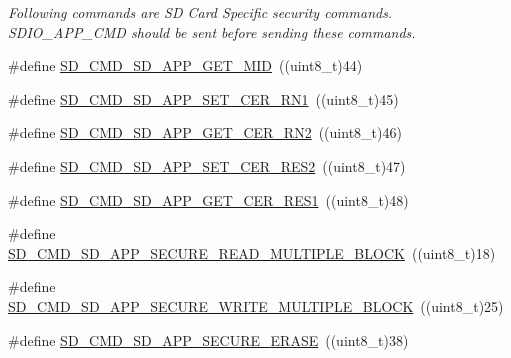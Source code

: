 \begin{DoxyCompactItemize}
\begin{DoxyCompactList}\small\item\em Following commands are SD Card Specific security commands. S\+D\+I\+O\+\_\+\+A\+P\+P\+\_\+\+C\+MD should be sent before sending these commands. \end{DoxyCompactList}\item 
\#define \hyperlink{group___s_t_m324x_g___e_v_a_l___s_d_i_o___s_d___exported___constants_gaf2e3bf3ef0ee9a3cbb20d43700521ea7}{S\+D\+\_\+\+C\+M\+D\+\_\+\+S\+D\+\_\+\+A\+P\+P\+\_\+\+G\+E\+T\+\_\+\+M\+ID}~((uint8\+\_\+t)44)
\item 
\#define \hyperlink{group___s_t_m324x_g___e_v_a_l___s_d_i_o___s_d___exported___constants_ga120a1adc8c10961c831b197f0fd51f76}{S\+D\+\_\+\+C\+M\+D\+\_\+\+S\+D\+\_\+\+A\+P\+P\+\_\+\+S\+E\+T\+\_\+\+C\+E\+R\+\_\+\+R\+N1}~((uint8\+\_\+t)45)
\item 
\#define \hyperlink{group___s_t_m324x_g___e_v_a_l___s_d_i_o___s_d___exported___constants_gab8fbec70c55b91b2227dd592b7257eae}{S\+D\+\_\+\+C\+M\+D\+\_\+\+S\+D\+\_\+\+A\+P\+P\+\_\+\+G\+E\+T\+\_\+\+C\+E\+R\+\_\+\+R\+N2}~((uint8\+\_\+t)46)
\item 
\#define \hyperlink{group___s_t_m324x_g___e_v_a_l___s_d_i_o___s_d___exported___constants_ga6775fd69fe0e739c7464951bd6aacdf1}{S\+D\+\_\+\+C\+M\+D\+\_\+\+S\+D\+\_\+\+A\+P\+P\+\_\+\+S\+E\+T\+\_\+\+C\+E\+R\+\_\+\+R\+E\+S2}~((uint8\+\_\+t)47)
\item 
\#define \hyperlink{group___s_t_m324x_g___e_v_a_l___s_d_i_o___s_d___exported___constants_ga0f39072d4c981331dfc1956c09d8a72c}{S\+D\+\_\+\+C\+M\+D\+\_\+\+S\+D\+\_\+\+A\+P\+P\+\_\+\+G\+E\+T\+\_\+\+C\+E\+R\+\_\+\+R\+E\+S1}~((uint8\+\_\+t)48)
\item 
\#define \hyperlink{group___s_t_m324x_g___e_v_a_l___s_d_i_o___s_d___exported___constants_ga7f4041b0d212f2d5d3f725b0beb97f0e}{S\+D\+\_\+\+C\+M\+D\+\_\+\+S\+D\+\_\+\+A\+P\+P\+\_\+\+S\+E\+C\+U\+R\+E\+\_\+\+R\+E\+A\+D\+\_\+\+M\+U\+L\+T\+I\+P\+L\+E\+\_\+\+B\+L\+O\+CK}~((uint8\+\_\+t)18)
\item 
\#define \hyperlink{group___s_t_m324x_g___e_v_a_l___s_d_i_o___s_d___exported___constants_ga97cfaea6d5d8646eda4e40b5e0bcbf94}{S\+D\+\_\+\+C\+M\+D\+\_\+\+S\+D\+\_\+\+A\+P\+P\+\_\+\+S\+E\+C\+U\+R\+E\+\_\+\+W\+R\+I\+T\+E\+\_\+\+M\+U\+L\+T\+I\+P\+L\+E\+\_\+\+B\+L\+O\+CK}~((uint8\+\_\+t)25)
\item 
\#define \hyperlink{group___s_t_m324x_g___e_v_a_l___s_d_i_o___s_d___exported___constants_ga60d30f8255fe89e8d1c4aaabb4f3a60f}{S\+D\+\_\+\+C\+M\+D\+\_\+\+S\+D\+\_\+\+A\+P\+P\+\_\+\+S\+E\+C\+U\+R\+E\+\_\+\+E\+R\+A\+SE}~((uint8\+\_\+t)38)

\end{DoxyCompactItemize}

